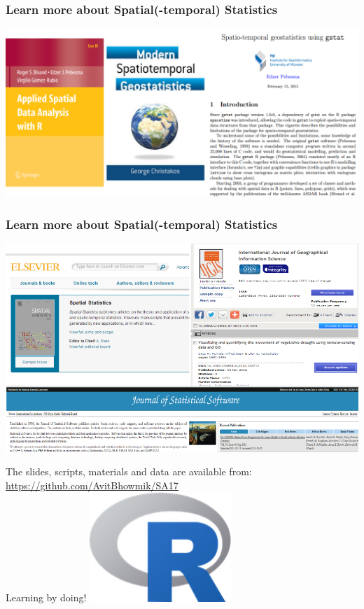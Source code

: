 \documentclass{beamer}
\begin{document}
\begin{frame}
\frametitle{Learn more about Spatial(-temporal) Statistics}
\centering
\includegraphics[width=\textwidth]{Figures/books.png}
\end{frame}


\begin{frame}
\frametitle{Learn more about Spatial(-temporal) Statistics}
\centering
\includegraphics[width=\textwidth]{Figures/journals.png}
\end{frame}


\begin{frame}
\centering
The slides, scripts, materials and data are available from:\\
\href{https://github.com/AvitBhowmik/SA17}{\alert{https://github.com/AvitBhowmik/SA17}}\\
\vspace{1cm}
\Huge Learning by doing!
\includegraphics[width=0.4\textwidth]{Figures/Rlogo.png}
\end{frame}
\end{document}

